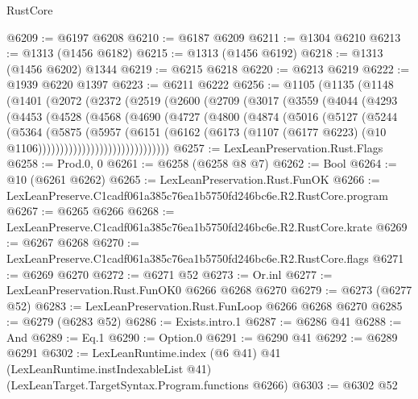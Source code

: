 \begin{lexlean}{RustCore}
\begin{coremodule}
@6209 := @6197 @6208
@6210 := @6187 @6209
@6211 := @1304 @6210
@6213 := @1313 (@1456 @6182)
@6215 := @1313 (@1456 @6192)
@6218 := @1313 (@1456 @6202) @1344
@6219 := @6215 @6218
@6220 := @6213 @6219
@6222 := @1939 @6220 @1397
@6223 := @6211 @6222
@6256 := @1105
    (@1135
      (@1148
        (@1401
          (@2072
            (@2372
              (@2519
                (@2600
                  (@2709
                    (@3017
                      (@3559
                        (@4044
                          (@4293
                            (@4453
                              (@4528
                                (@4568
                                  (@4690
                                    (@4727
                                      (@4800
                                        (@4874
                                          (@5016
                                            (@5127
                                              (@5244
                                                (@5364
                                                  (@5875
                                                    (@5957
                                                      (@6151
                                                        (@6162
                                                          (@6173
                                                            (@1107
                                                              (@6177 @6223)
                                                              (@10
                                                                @1106))))))))))))))))))))))))))))))
@6257 := LexLeanPreservation.Rust.Flags
@6258 := Prod.{0, 0}
@6261 := @6258 (@6258 @8 @7)
@6262 := Bool
@6264 := @10 (@6261 @6262)
@6265 := LexLeanPreservation.Rust.FunOK
@6266 := LexLeanPreserve.C1cadf061a385c76ea1b5750fd246bc6e.R2.RustCore.program
@6267 := @6265 @6266
@6268 := LexLeanPreserve.C1cadf061a385c76ea1b5750fd246bc6e.R2.RustCore.krate
@6269 := @6267 @6268
@6270 := LexLeanPreserve.C1cadf061a385c76ea1b5750fd246bc6e.R2.RustCore.flags
@6271 := @6269 @6270
@6272 := @6271 @52
@6273 := Or.inl
@6277 := LexLeanPreservation.Rust.FunOK0 @6266 @6268 @6270
@6279 := @6273 (@6277 @52)
@6283 := LexLeanPreservation.Rust.FunLoop @6266 @6268 @6270
@6285 := @6279 (@6283 @52)
@6286 := Exists.intro.{1}
@6287 := @6286 @41
@6288 := And
@6289 := Eq.{1}
@6290 := Option.{0}
@6291 := @6290 @41
@6292 := @6289 @6291
@6302 := LexLeanRuntime.index
    (@6 @41)
    @41
    (LexLeanRuntime.instIndexableList @41)
    (LexLeanTarget.TargetSyntax.Program.functions @6266)
@6303 := @6302 @52

\end{coremodule}
\end{lexlean}
